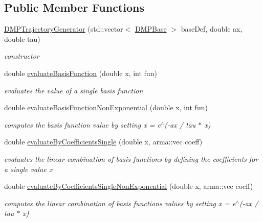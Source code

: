 \subsection*{Public Member Functions}
\begin{DoxyCompactItemize}
\item 
\hyperlink{classkukadu_1_1DMPTrajectoryGenerator_a0bf8fd4b7bc9aded7f0929743228e73a}{D\-M\-P\-Trajectory\-Generator} (std\-::vector$<$ \hyperlink{classkukadu_1_1DMPBase}{D\-M\-P\-Base} $>$ base\-Def, double ax, double tau)
\begin{DoxyCompactList}\small\item\em constructor \end{DoxyCompactList}\item 
double \hyperlink{classkukadu_1_1DMPTrajectoryGenerator_a6072064f086581981d1b1540953d4bd0}{evaluate\-Basis\-Function} (double x, int fun)
\begin{DoxyCompactList}\small\item\em evaluates the value of a single basis function \end{DoxyCompactList}\item 
double \hyperlink{classkukadu_1_1DMPTrajectoryGenerator_ad85bfa03fb1b426b9c808607a22d4f95}{evaluate\-Basis\-Function\-Non\-Exponential} (double x, int fun)
\begin{DoxyCompactList}\small\item\em computes the basis function value by setting x = e$^\wedge$(-\/ax / tau $\ast$ x) \end{DoxyCompactList}\item 
double \hyperlink{classkukadu_1_1DMPTrajectoryGenerator_aa14fb2c9ba08e0a8323090593b46d7f4}{evaluate\-By\-Coefficients\-Single} (double x, arma\-::vec coeff)
\begin{DoxyCompactList}\small\item\em evaluates the linear combination of basis functions by defining the coefficients for a single value x \end{DoxyCompactList}\item 
double \hyperlink{classkukadu_1_1DMPTrajectoryGenerator_a48f050d0bded75b1babaafda54aa0432}{evaluate\-By\-Coefficients\-Single\-Non\-Exponential} (double x, arma\-::vec coeff)
\begin{DoxyCompactList}\small\item\em computes the linear combination of basis functions values by setting x = e$^\wedge$(-\/ax / tau $\ast$ x) \end{DoxyCompactList}\item 

\end{DoxyCompactItemize}
